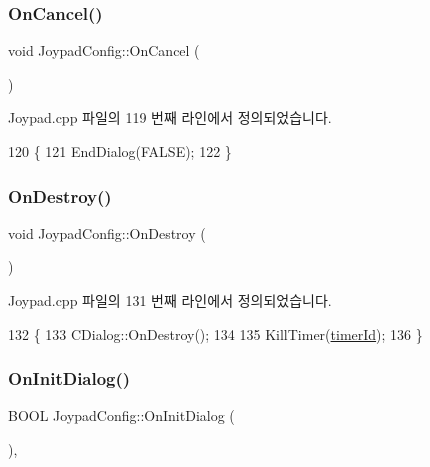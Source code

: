 \subsubsection{\texorpdfstring{On\+Cancel()}{OnCancel()}}
{\footnotesize\ttfamily void Joypad\+Config\+::\+On\+Cancel (\begin{DoxyParamCaption}{ }\end{DoxyParamCaption})\hspace{0.3cm}{\ttfamily [protected]}}



Joypad.\+cpp 파일의 119 번째 라인에서 정의되었습니다.


\begin{DoxyCode}
120 \{
121   EndDialog(FALSE);
122 \}
\end{DoxyCode}
\mbox{\label{class_joypad_config_a466cce6bccb02ce7a31dd5697668c904}} 
\subsubsection{\texorpdfstring{On\+Destroy()}{OnDestroy()}}
{\footnotesize\ttfamily void Joypad\+Config\+::\+On\+Destroy (\begin{DoxyParamCaption}{ }\end{DoxyParamCaption})\hspace{0.3cm}{\ttfamily [protected]}}



Joypad.\+cpp 파일의 131 번째 라인에서 정의되었습니다.


\begin{DoxyCode}
132 \{
133   CDialog::OnDestroy();
134   
135   KillTimer(\mbox{\hyperlink{class_joypad_config_ae2eb21b8f63e8cf86a5461e78901c3f5}{timerId}});
136 \}
\end{DoxyCode}
\mbox{\label{class_joypad_config_afc8d09942cc5d7ff9e69e27a98ff2430}} 
\subsubsection{\texorpdfstring{On\+Init\+Dialog()}{OnInitDialog()}}
{\footnotesize\ttfamily B\+O\+OL Joypad\+Config\+::\+On\+Init\+Dialog (\begin{DoxyParamCaption}{ }\end{DoxyParamCaption})\hspace{0.3cm}{\ttfamily [protected]}, {\ttfamily [virtual]}}




